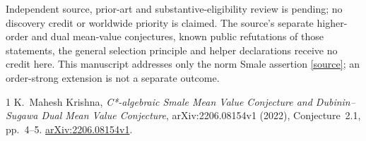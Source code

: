 \documentclass[11pt]{article}
\begin{document}
Independent source, prior-art and substantive-eligibility review is pending;
no discovery credit or worldwide priority is claimed. The source's separate
higher-order and dual mean-value conjectures, known public refutations of
those statements, the general selection principle and helper declarations
receive no credit here. This manuscript addresses only the norm Smale
assertion \eqref{source}; an order-strong extension is not a separate outcome.

\begin{thebibliography}{1}
 K.~Mahesh Krishna,
\emph{C*-algebraic Smale Mean Value Conjecture and Dubinin--Sugawa Dual Mean
Value Conjecture}, arXiv:2206.08154v1 (2022), Conjecture~2.1, pp.~4--5.
\href{https://arxiv.org/abs/2206.08154v1}{arXiv:2206.08154v1}.
\end{thebibliography}
\end{document}
